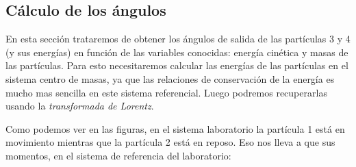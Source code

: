 \begin{minipage}[t]{0.45\linewidth} 
\begin{center}
\end{center}
\end{minipage}
\hfill
\begin{minipage}[t]{0.45\linewidth}
\begin{center}
\end{center}
\end{minipage}

\subsection{Cálculo de los ángulos}
En esta sección trataremos de obtener los ángulos de salida de las partículas 3 y 4 (y sus energías) en función de las variables conocidas: energía cinética y masas de las partículas. Para esto necesitaremos calcular las energías de las partículas en el sistema centro de masas, ya que las relaciones de conservación de la energía es mucho mas sencilla en este sistema referencial. Luego podremos recuperarlas usando la \textit{transformada de Lorentz}. 

Como podemos ver en las figuras, en el sistema laboratorio la partícula 1 está en movimiento mientras que la partícula 2 está en reposo. Eso nos lleva a que sus momentos, en el sistema de referencia del laboratorio:

